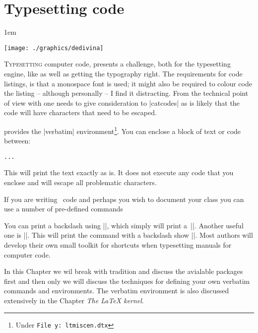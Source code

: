 \chapter{Typesetting code}
\clearpage
\parindent1em
\thispagestyle{plain}

\vspace*{1cm}
{\centering \texttt{[image: ./graphics/dedivina]} \par}

{\centering {}\par}

\bigskip

\begin{multicols}{2}

\lettrine{T}{ypesetting} computer code, presents a challenge, both for the typesetting engine, like \tex as well as getting the typography right. The requirements for code listings, is that a monospace font is used; it might also be required to colour code the listing -- although personally -- I find it distracting. From the technical point of view with \alltex one needs to give consideration to |catcodes| as is likely that the code will have characters that need to be escaped. 

\latex provides the |verbatim| environment\footnote{Under \texttt{File y: ltmiscen.dtx}}. You can enclose a block of text or code between:
\begin{Code}
\begin{verbatim}
...
\end{verbatim}
\end{Code}
\noindent This will print the text exactly as is. It does not execute any \tex  code that you enclose and will escape all problematic characters. 

If you are writing \LaTeXe ~code and perhaps you wish to document your class you can use a number of pre-defined commands

You can print a backslash using ||, which simply will print a~|\bs|. Another useful one is ||. This will print the command with a backslash show ||. Most \latex authors will develop their own small toolkit for shortcuts when typesetting manuals for computer code.

In this Chapter we wil break with tradition and discuss the avialable packages first and then only we will discuss the techniques for defining your own verbatim commands and environments. The \latex verbatim environment is also discussed extensively in the Chapter \textit{The LaTeX kernel}.
\end{multicols}

